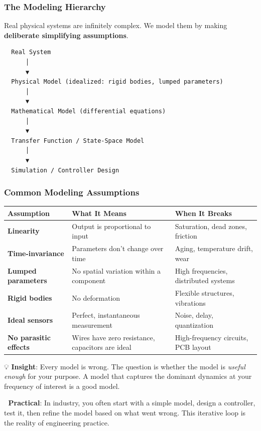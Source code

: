 \documentclass[11pt,a4paper]{book}
\begin{document}
\subsubsection{The Modeling Hierarchy}

Real physical systems are infinitely complex. We model them by making \textbf{deliberate simplifying assumptions}.

\begin{lstlisting}
  Real System
      │
      ▼
  Physical Model (idealized: rigid bodies, lumped parameters)
      │
      ▼
  Mathematical Model (differential equations)
      │
      ▼
  Transfer Function / State-Space Model
      │
      ▼
  Simulation / Controller Design
\end{lstlisting}

\subsubsection{Common Modeling Assumptions}

\begin{center}
\begin{tabular}{|l|l|l|}
\hline
Assumption & What It Means & When It Breaks \\
\hline
\textbf{Linearity} & Output is proportional to input & Saturation, dead zones, friction \\
\textbf{Time-invariance} & Parameters don't change over time & Aging, temperature drift, wear \\
\textbf{Lumped parameters} & No spatial variation within a component & High frequencies, distributed systems \\
\textbf{Rigid bodies} & No deformation & Flexible structures, vibrations \\
\textbf{Ideal sensors} & Perfect, instantaneous measurement & Noise, delay, quantization \\
\textbf{No parasitic effects} & Wires have zero resistance, capacitors are ideal & High-frequency circuits, PCB layout \\
\hline
\end{tabular}
\end{center}

💡 \textbf{Insight}: Every model is wrong. The question is whether the model is \textit{useful enough} for your purpose. A model that captures the dominant dynamics at your frequency of interest is a good model.

🔧 \textbf{Practical}: In industry, you often start with a simple model, design a controller, test it, then refine the model based on what went wrong. This iterative loop is the reality of engineering practice.
\end{document}
